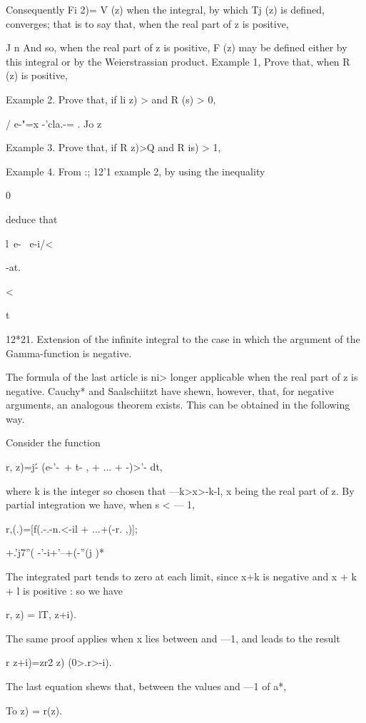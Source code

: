 Consequently Fi  2)= V (z) when the integral, by which Tj (z) is defined, 
converges; that is to say that, when the real part of z is positive, 

J n 
And so, when the real part of z is positive, F (z) may be defined either by 
this integral or by the Weierstrassian product. 
Example 1, Prove that, when R (z) is positive, 

Example 2. Prove that, if li  z) > and R (s) > 0, 

/ e-"=x -'cla.-= . 
Jo z  

Example 3. Prove that, if R z)>Q and R is) > 1, 

Example 4. From  :; 12'1 example 2, by using the inequality 

0%

deduce that 

l\ e- \ e-i/< 

-at. 



< 



t 

12*21. Extension of the infinite integral to the case in which the argument of the 
Gamma-function is negative. 

The formula of the last article is ni> longer applicable when the real part of z is 
negative. Cauchy* and Saalschiitzt have shewn, however, that, for negative arguments, 
an analogous theorem exists. This can be obtained in the following way. 

Consider the function 

r, z)=j\'- (e-'-\ + t- , + ... +  -)>'-  dt, 

where k is the integer so chosen that —k>x>-k-l, x being the real part of z. 
By partial integration we have, when s < — 1, 

r,(.)=[f(.-.-n.<-il + ...+(-r. ,)]; 

+.'j7''( -'-i+'--+(-''(j )* 

The integrated part tends to zero at each limit, since x+k is negative and x + k + l is 
positive : so we have 

r, z) = lT, z+i). 

The same proof applies when x lies between and —1, and leads to the result 

r z+i)=zr2 z) (0>.r>-i). 

The last equation shews that, between the values and —1 of a*, 

To z) = r(z). 


